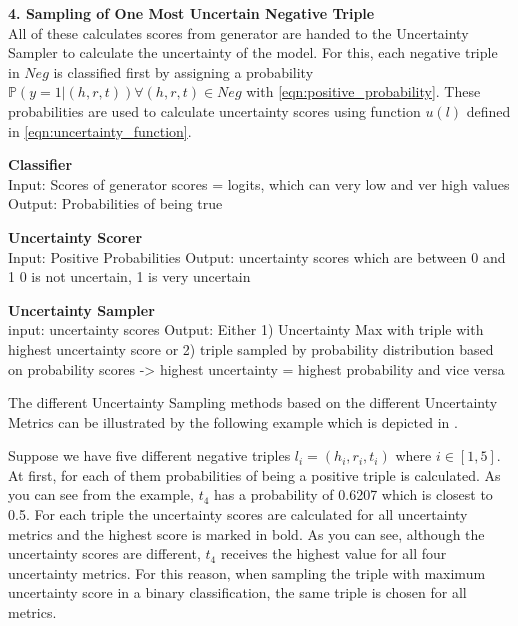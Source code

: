 \textbf{4. Sampling of One Most Uncertain Negative Triple}\\
All of these calculates scores from generator are handed to the Uncertainty Sampler to calculate the uncertainty of the model.
For this, each negative triple in $Neg$ is classified first by assigning a probability $\mathds{P}(y = 1 | (h,r,t)) \forall (h,r,t) \in Neg$ with \autoref{eqn:positive_probability}.
These probabilities are used to calculate uncertainty scores using function $u(l)$ defined in \autoref{eqn:uncertainty_function}.




\textbf{Classifier} \\
Input: Scores of generator
scores = logits, which can very low and ver high values
Output: Probabilities of being true

\textbf{Uncertainty Scorer}  \\
Input: Positive Probabilities
Output: uncertainty scores which are between 0 and 1
0 is not uncertain, 1 is very uncertain

\textbf{Uncertainty Sampler} \\
input: uncertainty scores
Output: Either 1) Uncertainty Max with triple with highest uncertainty score or 2) triple sampled by probability distribution based on probability scores
-> highest uncertainty = highest probability and vice versa











The different Uncertainty Sampling methods based on the different Uncertainty Metrics can be illustrated by the following example which is depicted in .

Suppose we have five different negative triples $l_i = (h_i, r_i, t_i)$ where $i \in [1,5]$.
At first, for each of them probabilities of being a positive triple is calculated.
As you can see from the example, $t_4$ has a probability of 0.6207 which is closest to 0.5.
For each triple the  uncertainty scores are calculated for all uncertainty metrics and the highest score is marked in bold.
As you can see, although the uncertainty scores are different, $t_4$ receives the highest value for all four uncertainty metrics.
For this reason, when sampling the triple with maximum uncertainty score in a binary classification, the same triple is chosen for all metrics.

